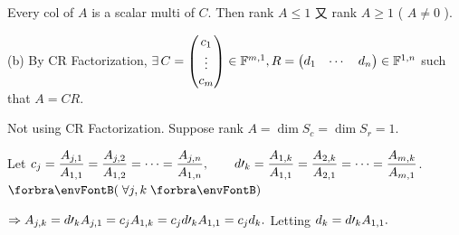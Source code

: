 \documentclass[a4paper, 11pt, UTF8]{article}
\begin{document}
\begin{large}
\par\quad\Ha
{\Large\vspace{6pt}Every col of $A$ is a scalar multi of $C.$ Then rank $A\leqslant 1$ 又 rank $A\geqslant 1$ ( $A\neq 0$ ).}\vspace{6pt}\par\quad
(b) By CR Factorization, $\exists\,C=\begin{pmatrix}c_1 \\ \vdots \\ c_m \end{pmatrix}\in{\mathbb{F}}^{m,1},R=\begin{pmatrix} d_1 & \cdots & d_n\end{pmatrix}\in{\mathbb{F}}^{1,n}$ such that $A=CR.$\vspace{4pt}\par\quad\Hb
\Or Not using CR Factorization. Suppose rank $A=\dim S_c=\dim S_r=1.$\vspace{4pt}\par\quad\Hb
{\Large\vspace{6pt}Let $c_j=\displaystyle\frac{A_{j,1}}{A_{1,1}}=\frac{A_{j,2}}{A_{1,2}}=\dots=\frac{A_{j,n}}{A_{1,n}},\qquad d\prime_k=\frac{A_{1,k}}{A_{1,1}}=\frac{A_{2,k}}{A_{2,1}}=\dots=\frac{A_{m,k}}{A_{m,1}}$.\quad$\Par{\,\forall j,k\,}$}\par\vspace{6pt}\quad\Hb
{\Large\vspace{6pt}$\Rightarrow A_{j,k}=d\prime_k A_{j,1}=c_j A_{1,k}=c_j d\prime_k A_{1,1}=c_j d_k.$ Letting $d_k=d\prime_k A_{1,1}.$}\PfEnd
\SepLine[10pt]


\end{large}
\end{document}

